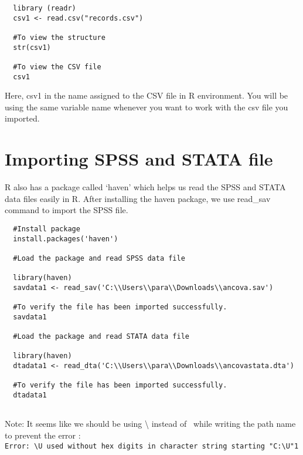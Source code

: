 \documentclass[
]{book}
\begin{document}
\begin{verbatim}
  library (readr)
  csv1 <- read.csv("records.csv")
  
  #To view the structure
  str(csv1)
  
  #To view the CSV file
  csv1
\end{verbatim}

Here, csv1 in the name assigned to the CSV file in R environment. You will be using the same variable name whenever you want to work with the csv file you imported.

\hypertarget{importing-spss-and-stata-file}{%
\section{Importing SPSS and STATA file}\label{importing-spss-and-stata-file}}

R also has a package called `haven' which helps us read the SPSS and STATA data files easily in R. After installing the haven package, we use read\_sav command to import the SPSS file.

\begin{verbatim}
  #Install package
  install.packages('haven')
  
  #Load the package and read SPSS data file
  
  library(haven)
  savdata1 <- read_sav('C:\\Users\\para\\Downloads\\ancova.sav')
  
  #To verify the file has been imported successfully.
  savdata1
  
  #Load the package and read STATA data file
  
  library(haven)
  dtadata1 <- read_dta('C:\\Users\\para\\Downloads\\ancovastata.dta')
  
  #To verify the file has been imported successfully.
  dtadata1
  
\end{verbatim}

Note: It seems like we should be using \textbackslash{} instead of ~while writing the path name to prevent the error : \texttt{Error:\ \textquotesingle{}\textbackslash{}U\textquotesingle{}\ used\ without\ hex\ digits\ in\ character\ string\ starting\ "\textquotesingle{}C:\textbackslash{}U"1}
\end{document}
